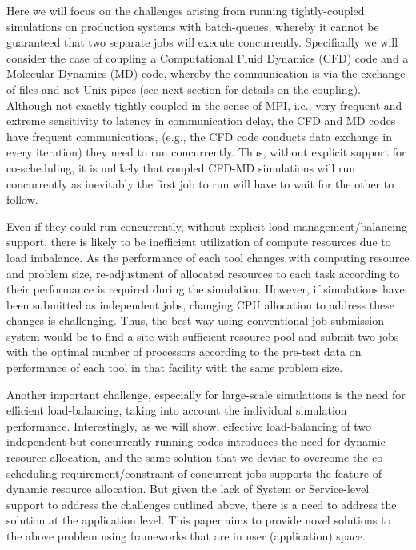 \documentclass[conference,final]{IEEEtran}
\begin{document}
Here we will focus on the challenges arising from running tightly-coupled simulations on production systems with batch-queues, whereby it cannot be guaranteed that two separate jobs will execute concurrently. Specifically we will consider the case of coupling a Computational Fluid Dynamics (CFD) code and a Molecular Dynamics (MD) code, whereby the communication is via the exchange of files and not Unix pipes (see next section for details on the coupling).  Although not exactly tightly-coupled in the sense of MPI, i.e., very frequent and extreme sensitivity to latency in communication delay, the CFD and MD codes have frequent communications, (e.g., the CFD code conducts data exchange in every iteration) they need to run concurrently.  Thus, without explicit support for co-scheduling, it is unlikely that coupled CFD-MD simulations will run concurrently as inevitably the first job to run will have to wait for the other to follow.

Even if they could run concurrently, without explicit load-management/balancing support, there is likely to be inefficient utilization of compute resources due to load imbalance.  As the performance of each tool changes with computing resource and problem size, re-adjustment of allocated resources to each task according to their performance is required during the simulation. However, if simulations have been submitted as independent jobs, changing CPU allocation to address these changes is challenging. Thus, the best way using conventional job submission system would be to find a site with sufficient resource pool and submit two jobs with the optimal number of processors according to the pre-test data on performance of each tool in that facility with the same problem size.

Another important challenge, especially for large-scale simulations is the need for efficient load-balancing, taking into account the individual simulation performance.  Interestingly, as we will show, effective load-balancing of two independent but concurrently running codes introduces the need for dynamic resource allocation, and the same solution that we devise to overcome the co-scheduling requirement/constraint of concurrent jobs supports the feature of dynamic resource allocation.  But given the lack of System or Service-level support to address the challenges outlined above, there is a need to address the solution at the application level. This paper aims to provide novel solutions to the above problem using frameworks that are in user (application) space.
\end{document}
